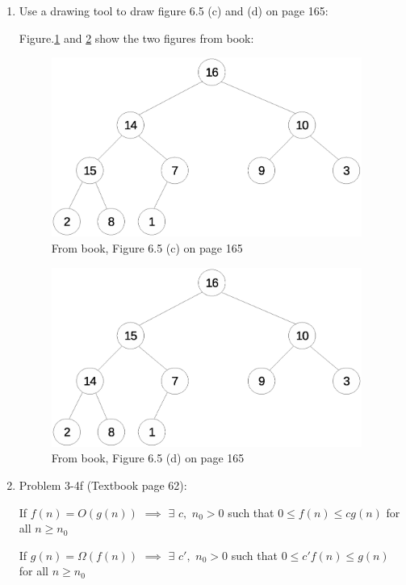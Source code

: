 \documentclass[11pt]{article}
\begin{document}
\begin{enumerate}

\itemsep 0.35in


\item Use a drawing tool to draw figure 6.5 (c) and (d) on page 165: 

	Figure.\ref{fig:prob1-c} and \ref{fig:prob1-d} show the two figures from book:

	\begin{figure}[h!]
		\centerline{\includegraphics[width=4in]{prob1-c.eps}}
		\caption{From book, Figure 6.5 (c) on page 165}
		\label{fig:prob1-c}
	\end{figure}
	
	\begin{figure}[h!]
		\centerline{\includegraphics[width=4in]{prob1-d.eps}}
		\caption{From book, Figure 6.5 (d) on page 165}
		\label{fig:prob1-d}
	\end{figure}





\item Problem 3-4f (Textbook page 62):

	If $ f(n)= O(g(n)) $ $\implies$ $ \exists $ $ c, $ $ n_0>0 $ such that $ 0 \leq f(n) \leq cg(n) $ for all $ n \geq n_0 $  
	
	If $ g(n)= \Omega(f(n)) $ $\implies$ $ \exists $ $ c{'}, $ $ n_0>0 $ such that $ 0 \leq c{'}f(n) \leq g(n) $ for all $ n \geq n_0 $     
	

\end{enumerate}
\end{document}
